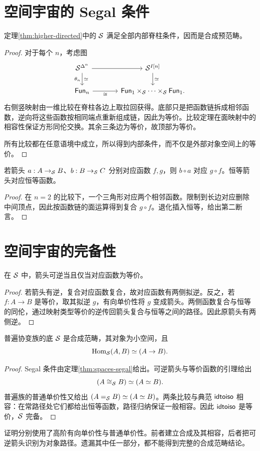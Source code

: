 \section{空间宇宙的 Segal 条件}
\begin{theorem}[空间对象的相容合成]\label{thm:spaces-segal}
定理\ref{thm:higher-directed}中的 $\mathcal S$ 满足全部内部脊柱条件，因而是合成预范畴。
\end{theorem}
\begin{proof}
对于每个 $n$，考虑图
\[
\begin{tikzcd}[column sep=large]
\Sp^{\Delta^n}\ar[r]\ar[d,"\theta_n"',"\simeq"]&\Sp^{I[n]}\ar[d,"\simeq"]\\
\mathsf{Fun}_n\ar[r,"\cong"']&
\mathsf{Fun}_1\times_{\Sp}\cdots\times_{\Sp}\mathsf{Fun}_1.
\end{tikzcd}
\]
右侧竖映射由一维比较在脊柱各边上取拉回获得。底部只是把函数链拆成相邻函数，逆向将这些函数按相同端点重新组成链，因此为等价。比较定理在面映射中的相容性保证方形同伦交换。其余三条边为等价，故顶部为等价。

所有比较都在任意语境中成立，所以得到内部条件，而不仅是外部对象空间上的等价。
\end{proof}
\begin{proposition}[合成对应函数复合]
若箭头 $a:A\to_\mathcal S B$、$b:B\to_\mathcal S C$ 分别对应函数 $f,g$，则 $b\circ a$ 对应 $g\circ f$。恒等箭头对应恒等函数。
\end{proposition}
\begin{proof}
在 $n=2$ 的比较下，一个三角形对应两个相邻函数。限制到长边对应删除中间顶点，因此按函数链的面运算得到复合 $g\circ f$。退化插入恒等，给出第二断言。
\end{proof}

\section{空间宇宙的完备性}
\begin{lemma}[可逆箭头与等价函数]
在 $\mathcal S$ 中，箭头可逆当且仅当对应函数为等价。
\end{lemma}
\begin{proof}
若箭头有逆，复合对应函数复合，故对应函数有两侧拟逆。反之，若 $f:A\to B$ 是等价，取其拟逆 $g$，有向单价性将 $g$ 变成箭头。两侧函数复合与恒等的同伦，通过映射类型等价的逆传回箭头复合与恒等之间的路径。因此原箭头有两侧逆。
\end{proof}
\begin{theorem}[空间范畴]\label{thm:spaces-category}
普遍协变族的底 $\mathcal S$ 是合成范畴，其对象为小空间，且
\[
\operatorname{Hom}_\mathcal S(A,B)\simeq(A\to B).
\]
\end{theorem}
\begin{proof}
Segal 条件由定理\ref{thm:spaces-segal}给出。可逆箭头与等价函数的引理给出
\[
(A\cong_\mathcal S B)\simeq(A\simeq B).
\]
普遍族的普通单价性又给出 $(A=_\mathcal S B)\simeq(A\simeq B)$。两条比较与典范 $\mathsf{idtoiso}$ 相容：在常路径处它们都给出恒等函数，路径归纳保证一般相容。因此 $\mathsf{idtoiso}$ 是等价，$\mathcal S$ 完备。
\end{proof}
\begin{remark}
证明分别使用了高阶有向单价性与普通单价性。前者建立合成及其相容，后者把可逆箭头识别为对象路径。遗漏其中任一部分，都不能得到完整的合成范畴结论。
\end{remark}

